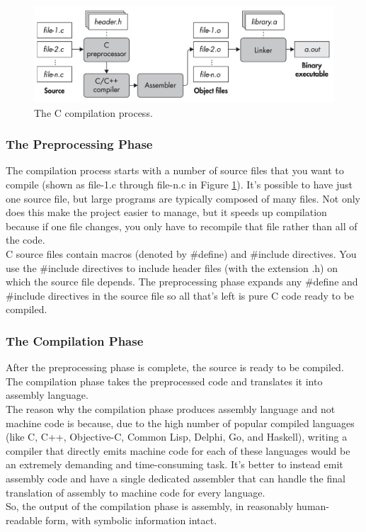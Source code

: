 \begin{figure}[H]
    \centering
    \includegraphics[width=0.8\linewidth]{Images/Compilation.png}
    \caption{The C compilation process.}
    \label{fig:Compilation}
\end{figure}

\subsubsection{The Preprocessing Phase}
The compilation process starts with a number of source files that you want to compile (shown as file-1.c through file-n.c in Figure \ref{fig:Compilation}). It’s possible to have just one source file, but large programs are typically composed of many files. Not only does this make the project easier to manage, but it speeds up compilation because if one file changes, you only have to recompile that file rather than all of the code. \\
C source files contain macros (denoted by \#define) and \#include directives. You use the \#include directives to include header files (with the extension .h) on which the source file depends. The preprocessing phase expands any \#define and \#include directives in the source file so all that’s left is pure C code ready to be compiled.

\subsubsection{The Compilation Phase}
After the preprocessing phase is complete, the source is ready to be compiled. The compilation phase takes the preprocessed code and translates it into assembly language. \\
The reason why the compilation phase produces assembly language and not machine code is because, due to the high number of popular compiled languages (like C, C++, Objective-C, Common Lisp, Delphi, Go, and Haskell), writing a compiler that directly emits machine code for each of these languages would be an extremely demanding and time-consuming task. It’s better to instead emit assembly code and have a single dedicated assembler that can handle the final translation of assembly to machine code for every language. \\
So, the output of the compilation phase is assembly, in reasonably human-readable form, with symbolic information intact.

